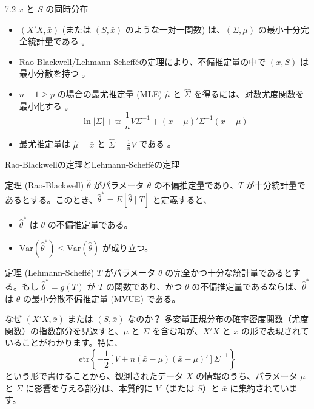 \documentclass[aspectratio=169]{beamer}
\begin{document}
\begin{frame}{7.2 $\bar{x}$ と $S$ の同時分布}
\begin{itemize}
    \item $(X'X, \bar{x})$ (または $(S, \bar{x})$ のような一対一関数) は、$(\Sigma, \mu)$ の最小十分完全統計量である 。
    \item Rao-Blackwell/Lehmann-Scheff\'eの定理により、不偏推定量の中で $(\bar{x}, S)$ は最小分散を持つ 。
    \item $n-1 \ge p$ の場合の最尤推定量 (MLE) $\hat{\mu}$ と $\hat{\Sigma}$ を得るには、対数尤度関数を最小化する 。
    \begin{equation*}
    \ln |\Sigma| + \text{tr }\frac{1}{n}V\Sigma^{-1} + (\bar{x} - \mu)'\Sigma^{-1}(\bar{x} - \mu) \tag{7.2}
    \end{equation*}
    \item 最尤推定量は $\hat{\mu} = \bar{x}$ と $\hat{\Sigma} = \frac{1}{n}V$ である 。
\end{itemize}
\end{frame}

\begin{frame}{Rao-Blackwellの定理とLehmann-Schefféの定理}
\begin{block}{定理 (Rao-Blackwell)}
$\hat{\theta}$ がパラメータ $\theta$ の不偏推定量であり、$T$ が十分統計量であるとする。このとき、$\hat{\theta}^* = E[\hat{\theta} \mid T]$ と定義すると、
\begin{itemize}
    \item $\hat{\theta}^*$ は $\theta$ の不偏推定量である。
    \item $\mathrm{Var}(\hat{\theta}^*) \leq \mathrm{Var}(\hat{\theta})$ が成り立つ。
\end{itemize}
\end{block}
\begin{block}{定理 (Lehmann-Scheffé)}
$T$ がパラメータ $\theta$ の完全かつ十分な統計量であるとする。もし $\hat{\theta}^* = g(T)$ が $T$ の関数であり、かつ $\theta$ の不偏推定量であるならば、$\hat{\theta}^*$ は $\theta$ の最小分散不偏推定量 (MVUE) である。
\end{block}
\end{frame}

\begin{frame}{なぜ $(X'X, \bar{x})$ または $(S, \bar{x})$ なのか？}
多変量正規分布の確率密度関数（尤度関数）の指数部分を見返すと、$\mu$ と $\Sigma$ を含む項が、$X'X$ と $\bar{x}$ の形で表現されていることがわかります。特に、
\[
\mathrm{etr}\left\{-\frac{1}{2}\left[V + n(\bar{x} - \mu)(\bar{x} - \mu)'\right]\Sigma^{-1}\right\}
\]
という形で書けることから、観測されたデータ $X$ の情報のうち、パラメータ $\mu$ と $\Sigma$ に影響を与える部分は、本質的に $V$（または $S$）と $\bar{x}$ に集約されています。\\
\end{frame}
\end{document}
